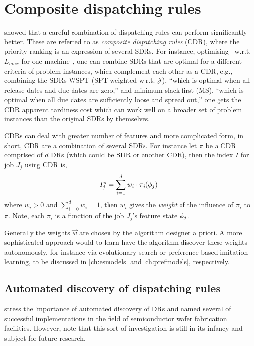 \section{Composite dispatching rules}\label{sec:CDR}
\citet{Jayamohan04} showed that a careful combination of dispatching rules can perform significantly better. These are referred to as \emph{composite dispatching rules} (CDR), where the priority ranking is an expression of several SDRs. For instance, optimising \JSP\ w.r.t. $L_{max}$ for one machine\ \cite[see. chapter 14.2]{Pinedo08}, one can combine SDRs that are optimal for a different criteria of problem instances, which complement each other as a CDR, e.g., combining the SDRs 
WSPT (SPT weighted w.r.t. $\mathcal{J}$), ``which is optimal when all release dates and due dates are zero,'' 
and minimum slack first (MS), ``which is optimal when all due dates are sufficiently loose and spread out,'' 
one gets the CDR apparent tardiness cost which can work well on a broader set 
of problem instances than the original SDRs by themselves.

CDRs can deal with greater number of features and more complicated form, in 
short, CDR are a combination of several SDRs. For instance let $\pi$ be a CDR 
comprised of $d$ DRs (which could be SDR or another CDR), then the index $I$ 
for job $J_j$ using CDR is, 
\begin{equation}
	I_j^{\pi} = \sum_{i=1}^d w_i \cdot \pi_i({\mathbf{\phi}}_j)
\end{equation}
where $w_i>0$ and $\sum_{i=0}^d w_i = 1$, then $w_i$ gives the \emph{weight} of 
the influence of $\pi_i$ to $\pi$. Note, 
each $\pi_i$ is a function of the job $J_j$'s feature state ${\mathbf{\phi}}_j$.

Generally the weights $\vec{w}$ are chosen by the algorithm designer a priori. 
A more sophisticated approach would to learn have the algorithm discover these 
weights autonomously, for instance via evolutionary search or preference-based 
imitation learning, to be discussed in \cref{ch:esmodels} and 
\cref{ch:prefmodels}, respectively.

\subsection*{Automated discovery of dispatching rules}
\citet{Monch13} stress the importance of automated discovery of DRs and named several of successful implementations in the field of semiconductor wafer fabrication facilities. 
However, \citeauthor{Monch13} note that this sort of investigation is still in its infancy and subject for future research.

